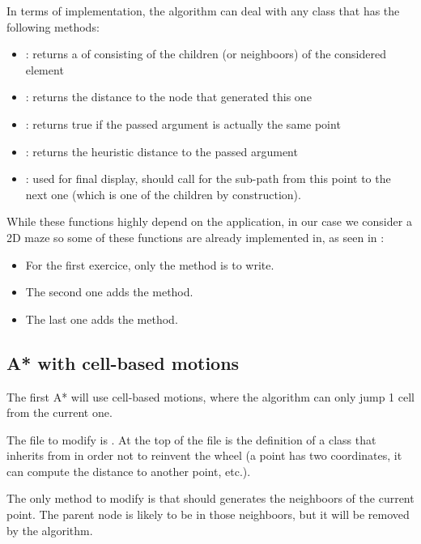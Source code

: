 \documentclass{ecnreport}
\begin{document}
In terms of implementation, the algorithm can deal with any  class that has the following methods:
\begin{itemize}
 \item {}: returns a  of  consisting of the children (or neighboors) of the considered
 element
 \item {}: returns the distance to the node that generated this one
 \item {}: returns true if the passed argument is actually the same point
 \item {}: returns the heuristic distance to the passed argument
 \item {}: used for final display, should call  for the sub-path from this point to the next one (which is one of the children by construction).
\end{itemize}


While these functions highly depend on the application, in our case we consider a 2D maze so some of these functions are already implemented in, as seen in :
\begin{itemize}
 \item For the first exercice, only the  method is to write.
 \item The second one adds the  method.
 \item The last one adds the  method.
\end{itemize}



\subsection{A* with cell-based motions}

The first A* will use cell-based motions, where the algorithm can only jump 1 cell from the current one.

The file to modify is .
At the top of the file is the definition of a  class
that inherits from  in order not to reinvent the wheel (a point has two coordinates, it can compute the distance to
another point, etc.).

The only method to modify is  that should generates the neighboors of the current point.
The parent node is likely to be in those neighboors, but it will be removed by the algorithm. 
\end{document}
